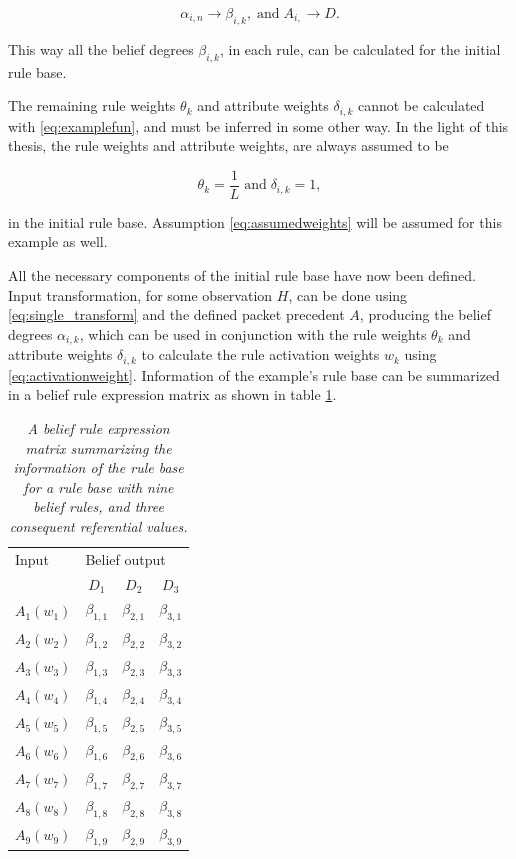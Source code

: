 \begin{equation}
     \alpha_{i,n} \to \beta_{i, k}, \;\text{and}\; A_{i,} \to D.
\end{equation}

This way all the belief degrees $\beta_{i,k}$, in each rule, can be calculated for the initial rule base.

The remaining rule weights $\theta_k$ and attribute weights $\delta_{i,k}$ cannot be calculated with \eqref{eq:examplefun}, and must be inferred in some
other way. In the light of this thesis, the rule weights and attribute weights, are always assumed to be

\begin{equation}
    \label{eq:assumedweights}
    \theta_k = \frac{1}{L}\;\text{and}\;\delta_{i,k} = 1,
\end{equation}

in the initial rule base. Assumption \eqref{eq:assumedweights} will be assumed for this example as well.

All the necessary components of the initial rule base have now been defined. Input transformation, for some observation
$H$, can be done using \eqref{eq:single_transform} and the defined packet precedent $A$, producing the belief degrees $\alpha_{i,k}$, which can
be used in conjunction with the rule weights $\theta_k$ and attribute weights $\delta_{i,k}$ to calculate the rule
activation weights $w_k$ using \eqref{eq:activationweight}. Information of the example's rule base can be summarized in a belief rule expression
matrix as shown in table \ref{tab:examplematrix}.

\begin{table}[h]
\centering
    \begin{tabular}{lccc}
    \toprule
    Input & \multicolumn{3}{l}{Belief output} \\
    \cline{2-4}
    & $D_1$ & $D_2$ & $D_3$ \\
    \midrule
    $A_1(w_1)$ & $\beta_{1,1}$ & $\beta_{2,1}$ & $\beta_{3,1}$ \\
    $A_2(w_2)$ & $\beta_{1,2}$ & $\beta_{2,2}$ & $\beta_{3,2}$ \\
    $A_3(w_3)$ & $\beta_{1,3}$ & $\beta_{2,3}$ & $\beta_{3,3}$ \\
    $A_4(w_4)$ & $\beta_{1,4}$ & $\beta_{2,4}$ & $\beta_{3,4}$ \\
    $A_5(w_5)$ & $\beta_{1,5}$ & $\beta_{2,5}$ & $\beta_{3,5}$ \\
    $A_6(w_6)$ & $\beta_{1,6}$ & $\beta_{2,6}$ & $\beta_{3,6}$ \\
    $A_7(w_7)$ & $\beta_{1,7}$ & $\beta_{2,7}$ & $\beta_{3,7}$ \\
    $A_8(w_8)$ & $\beta_{1,8}$ & $\beta_{2,8}$ & $\beta_{3,8}$ \\
    $A_9(w_9)$ & $\beta_{1,9}$ & $\beta_{2,9}$ & $\beta_{3,9}$ \\
    \bottomrule
    \end{tabular}
    \caption{\emph{A belief rule expression matrix summarizing the information of the rule base for a rule base with nine belief rules, and
    three consequent referential values.}}
    \label{tab:examplematrix}
\end{table}

